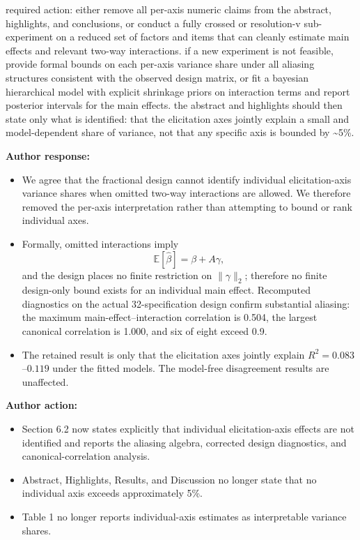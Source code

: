 \documentclass[11pt]{article}
\newcommand{\rvcomment}[1]{{\color{ReviewerGreen}#1}}
\begin{document}
\rvcomment{required action: either remove all per-axis numeric claims from the abstract, highlights,
and conclusions, or conduct a fully crossed or resolution-v sub-experiment on a reduced set of
factors and items that can cleanly estimate main effects and relevant two-way interactions. if a new
experiment is not feasible, provide formal bounds on each per-axis variance share under all aliasing
structures consistent with the observed design matrix, or fit a bayesian hierarchical model with
explicit shrinkage priors on interaction terms and report posterior intervals for the main effects.
the abstract and highlights should then state only what is identified: that the elicitation axes
jointly explain a small and model-dependent share of variance, not that any specific axis is bounded
by \textasciitilde5\%.}

\textbf{Author response:}

\begin{itemize}
\item We agree that the fractional design cannot identify individual elicitation-axis variance shares
when omitted two-way interactions are allowed. We therefore removed the per-axis interpretation
rather than attempting to bound or rank individual axes.
\item Formally, omitted interactions imply
\[
\mathbb{E}[\hat{\beta}] = \beta + A\gamma,
\]
and the design places no finite restriction on $\lVert\gamma\rVert_2$; therefore no finite
design-only bound exists for an individual main effect. Recomputed diagnostics on the actual
32-specification design confirm substantial aliasing: the maximum main-effect--interaction
correlation is 0.504, the largest canonical correlation is 1.000, and six of eight exceed 0.9.
\item The retained result is only that the elicitation axes jointly explain
$R^2=0.083$--$0.119$ under the fitted models. The model-free disagreement results are
unaffected.
\end{itemize}

\textbf{Author action:}

\begin{itemize}
\item Section 6.2 now states explicitly that individual elicitation-axis effects are not
identified and reports the aliasing algebra, corrected design diagnostics, and
canonical-correlation analysis.
\item Abstract, Highlights, Results, and Discussion no longer state that no individual axis
exceeds approximately 5\%.
\item Table 1 no longer reports individual-axis estimates as interpretable variance
shares.
\end{itemize}
\end{document}
